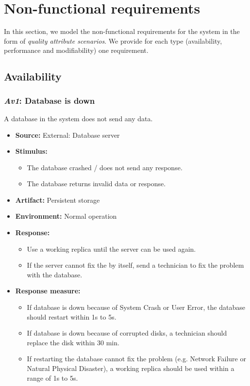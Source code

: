 \documentclass[english]{sareport}
\begin{document}
\chapter{Non-functional requirements}\label{sec:non-functional}
In this section, we model the non-functional requirements for the system in the
form of \emph{quality attribute scenarios}. We provide for each type
(availability, performance and modifiability) one requirement.

\section{Availability}
\subsection{\emph{Av1}: Database is down}
A database in the system does not send any data.

\begin{itemize}
    \item \textbf{Source:} External: Database server
    \item \textbf{Stimulus:}
        \begin{itemize}
            \item The database crashed / does not send any response.
            \item The database returns invalid data or response.
        \end{itemize}

    \item \textbf{Artifact:} Persistent storage
    \item \textbf{Environment:} Normal operation
    \item \textbf{Response:}
        \begin{itemize}
            \item Use a working replica until the server can be used again.
            \item If the server cannot fix the by itself, send a technician to
                  fix the problem with the database.
        \end{itemize}

    \item \textbf{Response measure:}
        \begin{itemize}
            \item If database is down because of System Crash or User Error,
                  the database should restart within 1s to 5s.
            \item If database is down because of corrupted disks, a technician
                  should replace the disk within 30 min.
            \item If restarting the database cannot fix the problem
                  (e.g. Network Failure or Natural Physical Disaster),
                  a working replica should be used within a range of 1s to 5s.
        \end{itemize}
\end{itemize}
\end{document}
